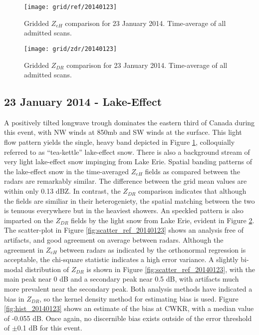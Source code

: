 \begin{figure}[p]
\texttt{[image: grid/ref/20140123]}
\caption{Gridded $Z_{eH}$ comparison for 23 January 2014. Time-average of all admitted scans.} 
\label{fig:grid_ref_20140123}
\end{figure}

\begin{figure}[p]
\texttt{[image: grid/zdr/20140123]}
\caption{Gridded $Z_{DR}$ comparison for 23 January 2014. Time-average of all admitted scans.} 
\label{fig:grid_zdr_20140123}
\end{figure}

\subsection{23 January 2014 - Lake-Effect}
A positively tilted longwave trough dominates the eastern third of Canada during this event, with NW
winds at 850mb and SW winds at the surface. This light flow pattern yields the single, heavy
band depicted in Figure \ref{fig:grid_ref_20140123}, colloquially referred to as ``tea-kettle'' lake-effect
snow. There is also a background stream of very light lake-effect snow impinging from Lake Erie.
Spatial banding patterns of the lake-effect snow in the time-averaged $Z_{eH}$ fields as compared 
between the radars are remarkably similar. The difference between the grid mean values are within only
0.13 dBZ. In contrast, the $Z_{DR}$ comparison indicates that
although the fields are similiar in their heterogeniety, the spatial matching between the two is tenuous
everywhere but in the heaviest showers. An speckled pattern is also imparted on the $Z_{DR}$ fields
by the light snow from Lake Erie, evident in Figure \ref{fig:grid_zdr_20140123}. The scatter-plot in Figure \ref{fig:scatter_ref_20140123} shows an analysis
free of artifacts, and good agreement on average between radars. Although the agreement in $Z_{eH}$ between radars as
indicated by the orthonormal regression is acceptable, the chi-square
statistic indicates a high error variance. A slightly bi-modal distribution of $Z_{DR}$ is shown in 
Figure \ref{fig:scatter_ref_20140123}, with the main peak near 0 dB and a secondary peak near 0.5 dB, with artifacts much more prevalent near the secondary
peak. Both analysis methods have indicated a bias in $Z_{DR}$, so the
kernel density method for estimating bias is used. Figure \ref{fig:hist_20140123} shows an estimate of
the bias at CWKR, with a median value of -0.055 dB. Once again, no discernible bias exists outside of the error
threshold of $\pm$0.1 dB for this event.

